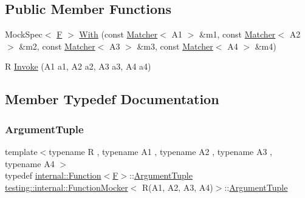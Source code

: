 \subsection*{Public Member Functions}
\begin{DoxyCompactItemize}
\item 
Mock\+Spec$<$ \mbox{\hyperlink{classtesting_1_1internal_1_1_function_mocker_3_01_r_07_a1_00_01_a2_00_01_a3_00_01_a4_08_4_a9be04bb962edb1458c857ca8e9db9318}{F}} $>$ \mbox{\hyperlink{classtesting_1_1internal_1_1_function_mocker_3_01_r_07_a1_00_01_a2_00_01_a3_00_01_a4_08_4_aee6e908e8409a52c44d3a8abd2bead99}{With}} (const \mbox{\hyperlink{classtesting_1_1_matcher}{Matcher}}$<$ A1 $>$ \&m1, const \mbox{\hyperlink{classtesting_1_1_matcher}{Matcher}}$<$ A2 $>$ \&m2, const \mbox{\hyperlink{classtesting_1_1_matcher}{Matcher}}$<$ A3 $>$ \&m3, const \mbox{\hyperlink{classtesting_1_1_matcher}{Matcher}}$<$ A4 $>$ \&m4)
\item 
R \mbox{\hyperlink{classtesting_1_1internal_1_1_function_mocker_3_01_r_07_a1_00_01_a2_00_01_a3_00_01_a4_08_4_ac20228ed7a21f43775a08fb3b1661721}{Invoke}} (A1 a1, A2 a2, A3 a3, A4 a4)
\end{DoxyCompactItemize}


\subsection{Member Typedef Documentation}
\mbox{\label{classtesting_1_1internal_1_1_function_mocker_3_01_r_07_a1_00_01_a2_00_01_a3_00_01_a4_08_4_a97576d71dfe85cbb0fc51fcaad6d4cc1}} 
\subsubsection{\texorpdfstring{ArgumentTuple}{ArgumentTuple}}
{\footnotesize\ttfamily template$<$typename R , typename A1 , typename A2 , typename A3 , typename A4 $>$ \\
typedef \mbox{\hyperlink{structtesting_1_1internal_1_1_function}{internal\+::\+Function}}$<$\mbox{\hyperlink{classtesting_1_1internal_1_1_function_mocker_3_01_r_07_a1_00_01_a2_00_01_a3_00_01_a4_08_4_a9be04bb962edb1458c857ca8e9db9318}{F}}$>$\+::\mbox{\hyperlink{classtesting_1_1internal_1_1_function_mocker_3_01_r_07_a1_00_01_a2_00_01_a3_00_01_a4_08_4_a97576d71dfe85cbb0fc51fcaad6d4cc1}{Argument\+Tuple}} \mbox{\hyperlink{classtesting_1_1internal_1_1_function_mocker}{testing\+::internal\+::\+Function\+Mocker}}$<$ R(A1, A2, A3, A4)$>$\+::\mbox{\hyperlink{classtesting_1_1internal_1_1_function_mocker_3_01_r_07_a1_00_01_a2_00_01_a3_00_01_a4_08_4_a97576d71dfe85cbb0fc51fcaad6d4cc1}{Argument\+Tuple}}}

